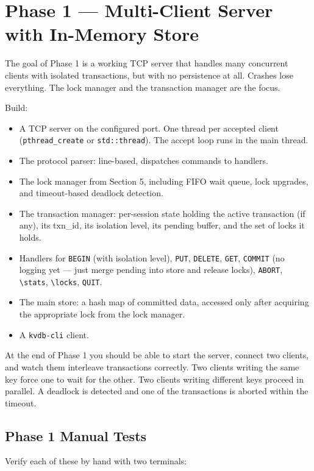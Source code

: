 \documentclass[11pt,a4paper]{article}
\begin{document}
\section{Phase 1 --- Multi-Client Server with In-Memory Store}

The goal of Phase 1 is a working TCP server that handles many concurrent clients with isolated transactions, but with no persistence at all. Crashes lose everything. The lock manager and the transaction manager are the focus.

Build:
\begin{itemize}
\item A TCP server on the configured port. One thread per accepted client (\texttt{pthread\_create} or \texttt{std::thread}). The accept loop runs in the main thread.

\item The protocol parser: line-based, dispatches commands to handlers.

\item The lock manager from Section 5, including FIFO wait queue, lock upgrades, and timeout-based deadlock detection.

\item The transaction manager: per-session state holding the active transaction (if any), its txn\_id, its isolation level, its pending buffer, and the set of locks it holds.

\item Handlers for \texttt{BEGIN} (with isolation level), \texttt{PUT}, \texttt{DELETE}, \texttt{GET}, \texttt{COMMIT} (no logging yet --- just merge pending into store and release locks), \texttt{ABORT}, \verb|\stats|, \verb|\locks|, \texttt{QUIT}.

\item The main store: a hash map of committed data, accessed only after acquiring the appropriate lock from the lock manager.

\item A \texttt{kvdb-cli} client.
\end{itemize}

At the end of Phase 1 you should be able to start the server, connect two clients, and watch them interleave transactions correctly. Two clients writing the same key force one to wait for the other. Two clients writing different keys proceed in parallel. A deadlock is detected and one of the transactions is aborted within the timeout.

\subsection{Phase 1 Manual Tests}
Verify each of these by hand with two terminals:
\end{document}
